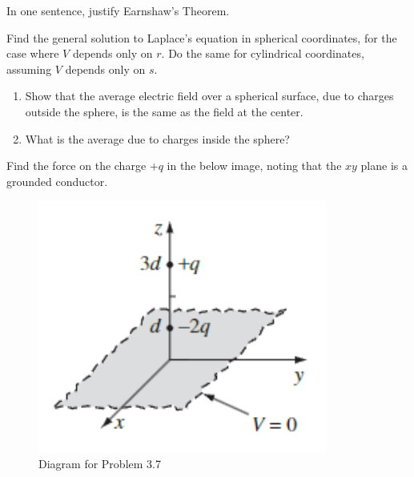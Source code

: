 \begin{hwkProblem}{3.2}{}

	In one sentence, justify Earnshaw's Theorem.

	\hwkSol{}

\end{hwkProblem}
\begin{hwkProblem}{3.3}{}

	Find the general solution to Laplace's equation in spherical coordinates, for the case where \( V \) depends only on \( r \). Do the same for cylindrical coordinates, assuming \( V \) depends only on \( s \).

	\hwkSol{}

\end{hwkProblem}
\begin{hwkProblem}{3.4}{}

	\begin{enumerate}
		\item Show that the average electric field over a spherical surface, due to charges outside the sphere, is the same as the field at the center.
		\item What is the average due to charges inside the sphere?
	\end{enumerate}

	\hwkSol{}

\end{hwkProblem}
\begin{hwkProblem}{3.7}{}

	Find the force on the charge \( +q \) in the below image, noting that the \( xy \) plane is a grounded conductor.
	\begin{figure}[H]
		\begin{center}
			\includegraphics[width=0.85\textwidth]{./images/p3_7.png}
		\end{center}
		\caption{Diagram for Problem 3.7}\label{fig:p3_7}
	\end{figure}

\end{hwkProblem}

